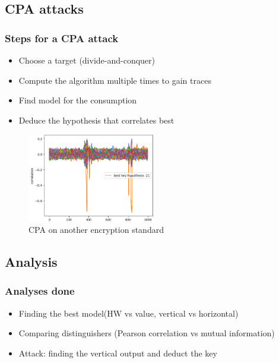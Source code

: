 \documentclass{beamer}
\begin{document}
	\subsection{CPA attacks}
	\begin{frame}
		\frametitle{Steps for a CPA attack}
		\begin{itemize}
			\item Choose a target (divide-and-conquer)
			\item Compute the algorithm multiple times to gain traces
			\item Find model for the consumption
			\item Deduce the hypothesis that correlates best
		\end{itemize}
		\begin{figure}[H]
			\includegraphics[width=0.5\textwidth]{img_files/corr_aes}
			\caption{CPA on another encryption standard}
		\end{figure}
	\end{frame}
	
	\subsection{Analysis}
	\begin{frame}
		\frametitle{Analyses done}
		\begin{itemize}
			\item Finding the best model(HW vs value, vertical vs horizontal)
			\item Comparing distinguishers (Pearson correlation vs mutual information)
			\item Attack: finding the vertical output and deduct the key
		\end{itemize}
	\end{frame}
	
	
\end{document}
